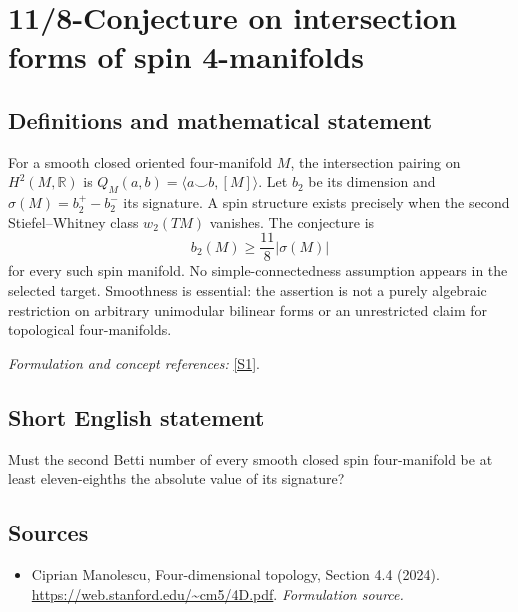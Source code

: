 \documentclass[11pt]{article}
\begin{document}
\section*{\texorpdfstring{11/8-Conjecture on intersection forms of spin 4-manifolds}{11/8-Conjecture on intersection forms of spin 4-manifolds}}\label{233}
\subsection{Definitions and mathematical statement}
For a smooth closed oriented four-manifold $M$, the intersection pairing on
$H^2(M,{\mathbb{R}})$ is $Q_M(a,b)=\langle a\smile b,[M]\rangle$. Let $b_2$ be its dimension and $\sigma(M)=b_2^+-b_2^-$ its signature. A spin structure exists precisely when the second Stiefel--Whitney class $w_2(TM)$ vanishes. The conjecture is
\[
 b_2(M)\ge\frac{11}{8}|\sigma(M)|
\]
for every such spin manifold. No simple-connectedness assumption appears in the selected target. Smoothness is essential: the assertion is not a purely algebraic restriction on arbitrary unimodular bilinear forms or an unrestricted claim for topological four-manifolds.
\par\smallskip\textit{Formulation and concept references:} \href{https://web.stanford.edu/~cm5/4D.pdf}{[S1]}.

\subsection{Short English statement}
Must the second Betti number of every smooth closed spin four-manifold be at least eleven-eighths the absolute value of its signature?
\subsection{Sources}
\begin{itemize}
\item[S1]Ciprian Manolescu, Four-dimensional topology, Section 4.4 (2024).
\url{https://web.stanford.edu/~cm5/4D.pdf}.
\textit{Formulation source.}
\end{itemize}
\end{document}
